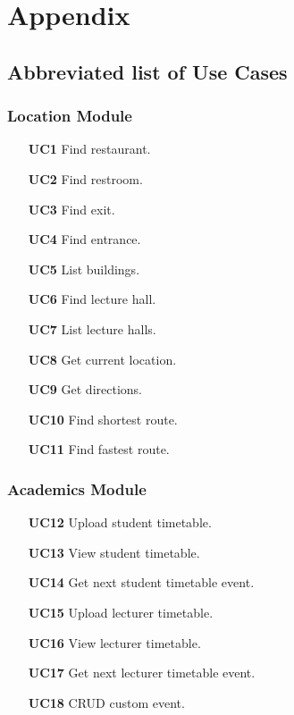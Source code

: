 \documentclass[12pt,a4paper]{article}
\begin{document}
	\pagebreak

	\section{Appendix}

		\subsection{Abbreviated list of Use Cases}

			\subsubsection{Location Module}

				\begin{itemize}
					\item [\textbf{UC1}] Find restaurant.
					\item [\textbf{UC2}] Find restroom.
					\item [\textbf{UC3}] Find exit.
					\item [\textbf{UC4}] Find entrance.
					\item [\textbf{UC5}] List buildings.
					\item [\textbf{UC6}] Find lecture hall.
					\item [\textbf{UC7}] List lecture halls.
					\item [\textbf{UC8}] Get current location.
					\item [\textbf{UC9}] Get directions.
					\item [\textbf{UC10}] Find shortest route.
					\item [\textbf{UC11}] Find fastest route.
				\end{itemize}

			\subsubsection{Academics Module}

				\begin{itemize}
					\item [\textbf{UC12}] Upload student timetable.
					\item [\textbf{UC13}] View student timetable.
					\item [\textbf{UC14}] Get next student timetable event.
					\item [\textbf{UC15}] Upload lecturer timetable.
					\item [\textbf{UC16}] View lecturer timetable.
					\item [\textbf{UC17}] Get next lecturer timetable event.
					\item [\textbf{UC18}] CRUD custom event.
				\end{itemize}
\end{document}
